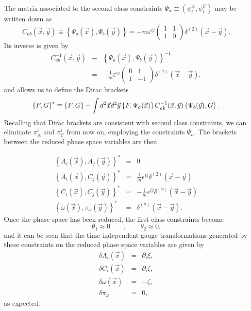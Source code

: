 \documentclass[a4paper,12pt]{article}
\newcommand{\db}[2]{\left\{#1,#2\right\}^*}
\renewcommand{\sup}[1]{^{(#1)}}
\newcommand{\dxy}{\delta\sup 2(\vec x-\vec y)}
\begin{document}
The matrix associated to the second class constraints
$\Psi_a\equiv(\psi_i^A,\psi_i^C)$ may be written down as
\begin{equation}
   \label{eq:1-21}
   C_{ab}(\vec x,\vec y)\equiv\left\{\Psi_a(\vec x),\Psi_b(\vec y)\right\}=
-m\varepsilon^{ij}\left(
     \begin{array}{ll}
     1&1\\
     1&0
     \end{array}\right)\dxy.
\end{equation}
Its  inverse is given by
\begin{eqnarray}
   C^{-1}_{ab}(\vec x,\vec y)&\equiv&\left\{\Psi_a(\vec x),
\Psi_b(\vec y)\right\}^{-1}\nonumber\\
                             &=&-\frac{1}m\varepsilon^{ij}\left(
     \begin{array}{cc}
     0&1\\
     1&-1
     \end{array}\right)\dxy\label{eq:1-22},
\end{eqnarray}
and allows us to define the Dirac brackets
\begin{equation}
\db FG\equiv\left\{F,G\right\}
-\int d^2\vec xd^2\vec y\left\{F,\Psi_a(\vec x)\right\}
C^{-1}_{ab}(\vec x,\vec y)\left\{\Psi_b(\vec y),G\right\}.\nonumber\\
\end{equation}
Recalling that Dirac brackets are consistent with  second class
constraints, we can eliminate $\pi^i_A$ and  $\pi^i_C$ from now
on, employing the constraints $\Psi_a$. The brackets between the
reduced phase space variables are then

\begin{eqnarray}
\db{A_i(\vec x)}{A_j(\vec y)}&=&0\label{DBA-1}\\
\db{A_i(\vec x)}{C_j(\vec y)}&=&\frac1{m}\epsilon^{ij}\dxy\\
\db{C_i(\vec x)}{C_j(\vec y)}&=&-\frac1{m}\epsilon^{ij}\dxy\\
\db{\omega(\vec x)}{\pi_\omega(\vec y)}&=&\dxy\label{DBA-Ult}.
\end{eqnarray}
Once the phase space has been reduced, the first class constraints become
\begin{equation}
\theta_1\approx 0\qquad,\qquad\theta_2\approx 0.
\end{equation}
and it can be seen that the time independent gauge transformations
generated by these constraints on the reduced phase space variables are
given by
\begin{eqnarray}
\delta A_i(\vec x)&=&\partial_i\xi,\\
\delta C_i(\vec x)&=&\partial_i\zeta,\\
\delta\omega(\vec x)&=&-\zeta,\\
\delta\pi_\omega&=&0,
\end{eqnarray}
as expected.
\end{document}

